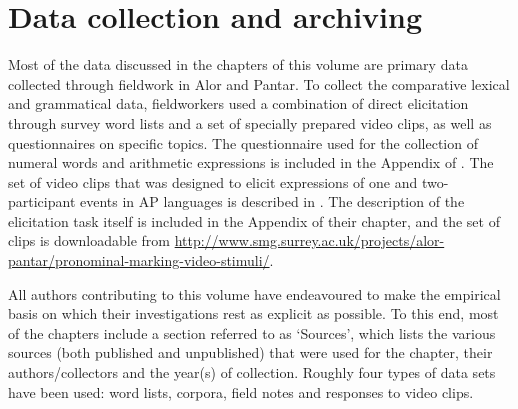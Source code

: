 \section{Data collection and archiving}\label{sec:1:8}

Most of the data discussed in the chapters of this volume are primary data collected through fieldwork in Alor and Pantar. To collect the comparative lexical and grammatical data, fieldworkers used a combination of direct elicitation through survey word lists and a set of specially prepared video clips, as well as questionnaires on specific topics. The questionnaire used for the collection of numeral words and arithmetic expressions is included in the Appendix of \citet{KlamerSchapperCorbettTVnumeralwords}. The set of video clips that was designed to elicit expressions of one and two-participant events in AP languages is described in \citet{FeddenEtAlTV}. The description of the elicitation task itself is included in the Appendix of their chapter, and the set of clips is downloadable from \url{http://www.smg.surrey.ac.uk/projects/alor-pantar/pronominal-marking-video-stimuli/}.

All authors contributing to this volume have endeavoured to make the empirical basis on which their investigations rest as explicit as possible. To this end, most of the chapters include a section referred to as `Sources', which lists the various sources (both published and unpublished) that were used for the chapter, their authors/collectors and the year(s) of collection. Roughly four types of data sets have been used: word lists, corpora, field notes and responses to video clips. 

